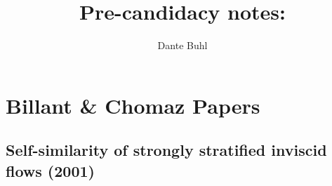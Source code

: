 \documentclass{article}
\begin{document}
\title{Pre-candidacy notes: }
\author{Dante Buhl}

\newcommand{\wrms}{w_{\text{rms}}}
\newcommand{\bs}[1]{\boldsymbol{#1}}
\newcommand{\tb}[1]{\textbf{#1}}
\newcommand{\bmp}[1]{\begin{minipage}{#1\textwidth}}
\newcommand{\emp}{\end{minipage}}
\newcommand{\R}{\mathbb{R}}
\newcommand{\C}{\mathbb{C}}
\newcommand{\N}{\mathcal{N}}
\newcommand{\K}{\bs{\mathrm{K}}}
\newcommand{\m}{\bs{\mu}_*}
\newcommand{\s}{\bs{\Sigma}_*}
\newcommand{\dt}{\Delta t}
\newcommand{\dx}{\Delta x}
\newcommand{\tr}[1]{\text{Tr}(#1)}
\newcommand{\Tr}[1]{\text{Tr}(#1)}
\newcommand{\Div}{\nabla \cdot}
\renewcommand{\div}{\nabla \cdot}
\newcommand{\Curl}{\nabla \times}
\newcommand{\Grad}{\nabla}
\newcommand{\grad}{\nabla}
\newcommand{\grads}{\nabla_s}
\newcommand{\gradf}{\nabla_f}
\newcommand{\xs}{x_s}
\newcommand{\xf}{x_f}
\newcommand{\ts}{t_s}
\newcommand{\tf}{t_f}
\newcommand{\pt}{\partial t}
\newcommand{\pz}{\partial z}
\newcommand{\uvec}{\bs{u}}
\newcommand{\F}{\bs{F}}
\newcommand{\T}{\tilde{T}}
\newcommand{\ez}{\bs{e}_z}
\newcommand{\ex}{\bs{e}_x}
\newcommand{\ey}{\bs{e}_y}
\newcommand{\eo}{\bs{e}_{\bs{\Omega}}}
\newcommand{\ppt}[1]{\frac{\partial #1}{\partial t}}
\newcommand{\DDt}[1]{\frac{D #1}{D t}}
\newcommand{\ppts}[1]{\frac{\partial #1}{\partial t_s}}
\newcommand{\pptf}[1]{\frac{\partial #1}{\partial t_f}}
\newcommand{\ppz}[1]{\frac{\partial #1}{\partial z}}
\newcommand{\ddz}[1]{\frac{d #1}{d z}}
\newcommand{\ppzetas}[1]{\frac{\partial^2 #1}{\partial \zeta^2}}
\newcommand{\ppzs}[1]{\frac{\partial #1}{\partial z_s}}
\newcommand{\ppzf}[1]{\frac{\partial #1}{\partial z_f}}
\newcommand{\ppx}[1]{\frac{\partial #1}{\partial x}}
\newcommand{\ppxi}[1]{\frac{\partial #1}{\partial x_i}}
\newcommand{\ppxj}[1]{\frac{\partial #1}{\partial x_j}}
\newcommand{\ppy}[1]{\frac{\partial #1}{\partial y}}
\newcommand{\ppzeta}[1]{\frac{\partial #1}{\partial \zeta}}


\maketitle 
\setlength{\parindent}{0pt}

\section{Billant \& Chomaz Papers}

\subsection{Self-similarity of strongly stratified inviscid flows (2001)}
\end{document}
